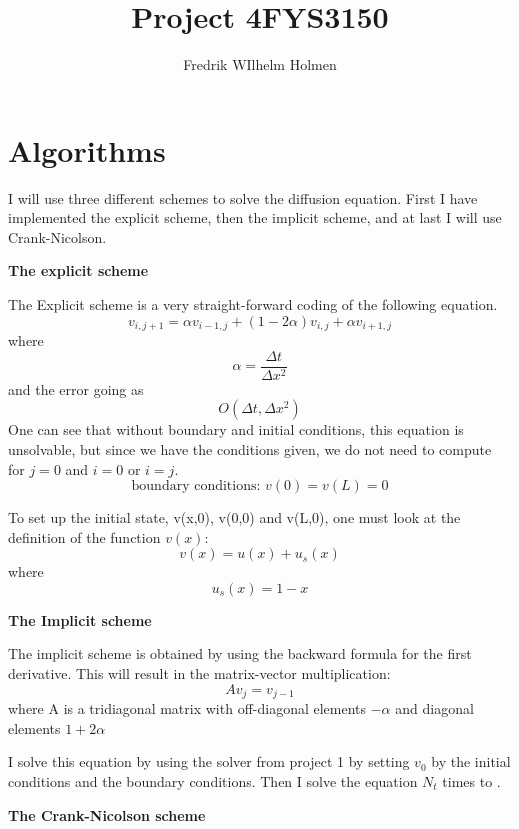 \documentclass[a4paper, 12pt, titlepage]{article}
\author{Fredrik WIlhelm Holmen}
\title{Project 4}
\title{FYS3150}
\newcommand{\f}[2]{\frac{#1}{#2}}
\newcommand{\beq}{\begin{equation*}}
\newcommand{\eeq}{\end{equation*}}
\begin{document}
  \maketitle
  \newpage

  \section*{Algorithms}
    I will use three different schemes to solve the diffusion equation. First I have implemented
    the explicit scheme, then the implicit scheme, and at last I will use Crank-Nicolson.
    \par 
    {\bf The explicit scheme} \par
      The Explicit scheme is a very straight-forward coding of the following equation. 
			\beq
			v_{i,j+1} = \alpha v_{i-1,j} + (1-2\alpha)v_{i,j} + \alpha v_{i+1,j}
			\eeq
      where \beq \alpha = \f{\Delta t}{\Delta x^2} \eeq    
      and the error going as \beq O(\Delta t, \Delta x^2) \eeq
      One can see that without boundary and initial conditions, this equation is unsolvable, but
      since we have the conditions given, we do not need to compute for $j=0$ and $i=0$ or $i=j$.
      \beq \text{boundary conditions: } v(0) = v(L) = 0 \eeq 
      
      To set up the initial state, v(x,0), v(0,0) and v(L,0), one must look at the definition of the 
      function $v(x)$: 
      \beq v(x) = u(x) + u_s(x) \eeq 
      where \beq u_s(x) = 1-x \eeq
      
    
    {\bf The Implicit scheme} \par
      The implicit scheme is obtained by using the backward formula for the first derivative. This will
      result in the matrix-vector multiplication: \beq Av_j = v_{j-1} \eeq where A is a tridiagonal matrix
      with off-diagonal elements $-\alpha$ and diagonal elements $1+2\alpha$\par
      I solve this equation by using the solver from project 1 by setting $v_0$ by the initial conditions 
      and the boundary conditions. Then I solve the equation $N_t$ times to . \par
    {\bf The Crank-Nicolson scheme}
\end{document}
